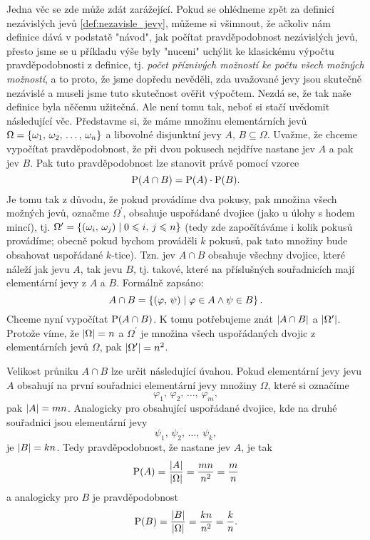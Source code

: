Jedna věc se zde může zdát zarážející. Pokud se ohlédneme zpět za definicí nezávislých jevů \ref{def:nezavisle_jevy}, můžeme si všimnout, že ačkoliv nám definice dává v podstatě "návod", jak počítat pravděpodobnost nezávislých jevů, přesto jsme se u příkladu výše byly "nuceni" uchýlit ke klasickému výpočtu pravděpodobnosti z definice, tj. \emph{počet příznivých možností ke počtu všech možných možností}, a to proto, že jsme dopředu nevěděli, zda uvažované jevy jsou skutečně nezávislé a museli jsme tuto skutečnost ověřit výpočtem. Nezdá se, že tak naše definice byla něčemu užitečná. Ale není tomu tak, neboť si stačí uvědomit následující věc. Představme si, že máme množinu elementárních jevů $\Omega=\left\{\omega_1,\,\omega_2,\,\dots,\,\omega_n\right\}$ a libovolné disjunktní jevy $A,\,B\subseteq\Omega$. Uvažme, že chceme vypočítat pravděpodobnost, že při dvou pokusech nejdříve nastane jev $A$ a pak jev $B$. Pak tuto pravděpodobnost lze stanovit právě pomocí vzorce
\[\operatorname{\text{P}}(A\cap B)=\operatorname{\text{P}}(A)\cdot\operatorname{\text{P}}(B).\]
Je tomu tak z důvodu, že pokud provádíme dva pokusy, pak množina všech možných jevů, označme $\Omega^\prime$, obsahuje uspořádané dvojice (jako u úlohy s hodem mincí), tj. $\Omega^\prime=\left\{(\omega_i,\,\omega_j)\;\middle\vert\; 0\leqslant i,\,j\leqslant n\right\}$ (tedy zde započítáváme i kolik pokusů provádíme; obecně pokud bychom prováděli $k$ pokusů, pak tato množiny bude obsahovat uspořádané $k$-tice). Tzn. jev $A\cap B$ obsahuje všechny dvojice, které náleží jak jevu $A$, tak jevu $B$, tj. takové, které na příslušných souřadnicích mají elementární jevy z $A$ a $B$. Formálně zapsáno:
\[A\cap B=\left\{(\varphi,\,\psi)\;\middle\vert\;\varphi\in A \land \psi\in B\right\}.\]
Chceme nyní vypočítat $\operatorname{\text{P}}(A\cap B)$. K tomu potřebujeme znát $\left| A\cap B \right|$ a $\left| \Omega^\prime \right|$. Protože víme, že $\left| \Omega \right|=n$ a $\Omega^\prime$ je množina všech uspořádaných dvojic z elementárních jevů $\Omega$, pak $\left| \Omega^\prime \right|=n^2$.\par
Velikost průniku $A\cap B$ lze určit následující úvahou. Pokud elementární jevy jevu $A$ obsahují na první souřadnici elementární jevy množiny $\Omega$, které si označíme
\[\varphi_1,\,\varphi_2,\,\dots,\,\varphi_m,\]
pak $\left| A \right|=mn$. Analogicky pro obsahující uspořádané dvojice, kde na druhé souřadnici jsou elementární jevy
\[\psi_1,\,\psi_2,\,\dots,\,\psi_k,\]
je $\left| B \right|=kn$. Tedy pravděpodobnost, že nastane jev $A$, je tak
\[\operatorname{\text{P}}(A)=\dfrac{\left| A \right|}{\left| \Omega \right|}=\dfrac{mn}{n^2}=\dfrac{m}{n}\]
a analogicky pro $B$ je pravděpodobnost
\[\operatorname{\text{P}}(B)=\dfrac{\left| B \right|}{\left| \Omega \right|}=\dfrac{kn}{n^2}=\dfrac{k}{n}.\]
